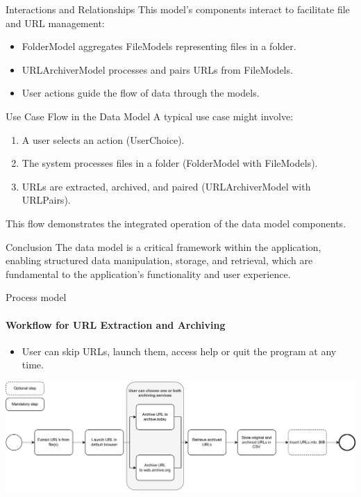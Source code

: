 \documentclass[
    ngerman,%
    authorontitle=true,
]{bfhbeamer}
\begin{document}
    \begin{frame}{Interactions and Relationships}
        This model's components interact to facilitate file and URL management:
        \begin{itemize}
            \item FolderModel aggregates FileModels representing files in a folder.
            \item URLArchiverModel processes and pairs URLs from FileModels.
            \item User actions guide the flow of data through the models.
        \end{itemize}
    \end{frame}

    \begin{frame}{Use Case Flow in the Data Model}
        A typical use case might involve:
        \begin{enumerate}
            \item A user selects an action (UserChoice).
            \item The system processes files in a folder (FolderModel with FileModels).
            \item URLs are extracted, archived, and paired (URLArchiverModel with URLPairs).
        \end{enumerate}
        This flow demonstrates the integrated operation of the data model components.
    \end{frame}

    \begin{frame}{Conclusion}
        The data model is a critical framework within the application, enabling structured data manipulation, storage, and retrieval, which are fundamental to the application's functionality and user experience.
    \end{frame}


    \begin{frame}{Process model}
        \framesubtitle{Workflow for URL Extraction and Archiving}
        \begin{itemize}
            \item User can skip URLs, launch them, access help or quit the program at any time.
        \end{itemize}
        \vspace{0.8cm}
        \includegraphics[width=1\textwidth]{pictures/process_model-simple}
    \end{frame}
\end{document}
